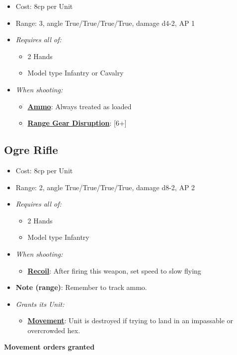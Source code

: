 \documentclass[a4paper,12pt]{article}
\begin{document}
\begin{itemize}
\item Cost: 8cp per Unit
\item Range: 3, angle True/True/True/True, damage d4-2, AP 1
\item \textit{Requires all of:}
\begin{itemize}
\item 2 Hands
\item Model type Infantry or Cavalry
\end{itemize}
\item \textit{When shooting:}
\begin{itemize}
\item \textbf{\hyperref[rule-special-ammo]{Ammo}}: Always treated as loaded
\item \textbf{\hyperref[rule-special-range-gear-disruption]{Range Gear Disruption}}: [6+]

\end{itemize}






\end{itemize}

\subsection{Ogre Rifle}
\label{equipment-ogre-rifle}

\begin{itemize}
\item Cost: 8cp per Unit
\item Range: 2, angle True/True/True/True, damage d8-2, AP 2
\item \textit{Requires all of:}
\begin{itemize}
\item 2 Hands
\item Model type Infantry
\end{itemize}
\item \textit{When shooting:}
\begin{itemize}
\item \textbf{\hyperref[rule-special-recoil]{Recoil}}: After firing this weapon, set speed to slow flying

\end{itemize}

\item \textbf{Note (range)}: Remember to track ammo.



\item \textit{Grants its Unit:}
\begin{itemize}
\item \textbf{\hyperref[rule-special-movement]{Movement}}: Unit is destroyed if trying to land in an impassable or overcrowded hex.

\end{itemize}


\end{itemize}
\noindent\textbf{Movement orders granted}
\end{document}
